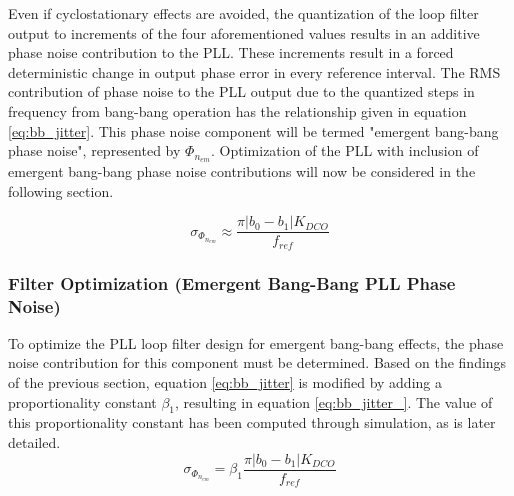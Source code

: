 	Even if cyclostationary effects are avoided, the quantization of the loop filter output to increments of the four aforementioned values results in an additive phase noise contribution to the PLL. These increments result in a forced deterministic change in output phase error in every reference interval. The RMS contribution of phase noise to the PLL output due to the quantized steps in frequency from bang-bang operation  has the relationship given in equation \ref{eq:bb_jitter}. This phase noise component will be termed "emergent bang-bang phase noise", represented by $\Phi_{n_{em}}$. Optimization of the PLL with inclusion of emergent bang-bang phase noise contributions will now be considered in the following section. 

		\begin{equation}\label{eq:bb_jitter}
			\sigma_{\Phi_{n_{em}}} \approx \frac{\pi|b_0-b_1|K_{DCO}}{f_{ref}}
		\end{equation}



	\FloatBarrier\subsubsection{Filter Optimization (Emergent Bang-Bang PLL Phase Noise)}\label{sec:bb_noise}
	To optimize the PLL loop filter design for emergent bang-bang effects, the phase noise contribution for this component must be determined. Based on the findings of the previous section, equation \ref{eq:bb_jitter} is modified by adding a proportionality constant $\beta_1$, resulting in equation \ref{eq:bb_jitter_}. The value of this proportionality constant has been computed through simulation, as is later detailed.
		\begin{equation}\label{eq:bb_jitter_}
			\sigma_{\Phi_{n_{em}}} = \beta_1\frac{\pi|b_0-b_1|K_{DCO}}{f_{ref}}
		\end{equation}

